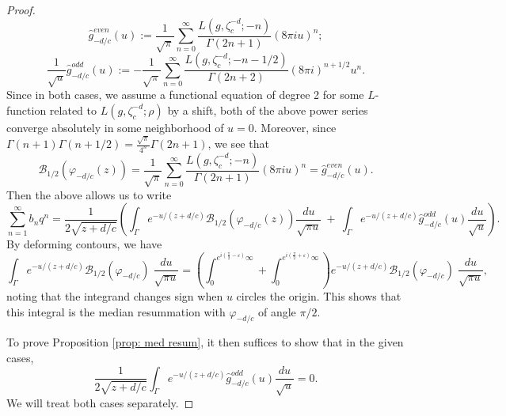 \documentclass[12pt]{amsart}
\theoremstyle{definition}
\theoremstyle{plain}
\numberwithin{equation}{section}
\begin{document}
\begin{proof}
\[
\widehat{g}_{-d/c}^{even}(u) := \frac{1}{\sqrt{\pi }} \sum_{n=0}^\infty \frac{ L(g, \zeta_c^{-d};-n)}{\Gamma(2n+1)}(8\pi iu)^{n};
\]
\[
\frac{1}{\sqrt{u}}\widehat{g}_{-d/c}^{odd}(u) := -\frac{1}{\sqrt{\pi }} \sum_{n=0}^\infty \frac{ L(g, \zeta_c^{-d};-n-1/2)}{\Gamma(2n+2)}(8\pi i)^{n+1/2}u^{n}.
\]
Since in both cases, we assume a functional equation of degree 2 for some $L$-function related to $L(g, \zeta_c^{-d}; \rho)$ by a shift, both of the above power series converge absolutely in some neighborhood of $u=0$. 
Moreover, since $\Gamma(n+1)\Gamma(n+1/2) = \frac{\sqrt{\pi}}{4^n} \Gamma(2n+1)$, we see that 
\[
\mathcal{B}_{1/2}(\varphi_{-d/c}(z)) = \frac{1}{\sqrt{\pi }} \sum_{n=0}^\infty \frac{ L(g, \zeta_c^{-d};-n)}{\Gamma(2n+1)}(8\pi iu)^{n} = \widehat{g}_{-d/c}^{even}(u).
\]
Then the above allows us to write
\begin{equation*}%
\sum_{n = 1}^\infty b_n q^n =  \frac{1}{2\sqrt{z+d/c}} \left( \int_{\Gamma}e^{-u/(z+d/c)} \mathcal{B}_{1/2}(\varphi_{-d/c}(z)) \frac{du}{\sqrt{\pi u}} \ + \ \int_{\Gamma}e^{-u/(z+d/c)}\widehat{g}_{-d/c}^{odd}(u)\frac{du}{\sqrt{u}}\right).
\end{equation*}
By deforming contours, we have
\[
\int_\Gamma e^{-u/(z+d/c)}\mathcal{B}_{1/2}(\varphi_{-d/c})\;\frac{du}{\sqrt{\pi u}} = \left(\int_0^{e^{i(\frac{\pi}{2}-\varepsilon)}\infty}+ \int_0^{e^{i(\frac{\pi}{2}+\varepsilon)}\infty}\right) e^{-u/(z+d/c)}\mathcal{B}_{1/2}(\varphi_{-d/c})\;\frac{du}{\sqrt{\pi u}},
\]	
 noting that the integrand changes sign when $u$ circles the origin. This shows that this integral is the median resummation with $\varphi_{-d/c}$ of angle $\pi/2$. 

To prove Proposition \ref{prop: med resum}, it then suffices to show that in the given cases,
\begin{equation}\label{eqn: 0 integral}
\frac{1}{2\sqrt{z+d/c}}\int_{\Gamma}e^{-u/(z+d/c)}\widehat{g}_{-d/c}^{odd}(u)\frac{du}{\sqrt{u}} = 0.
\end{equation}
We will treat both cases separately. 


\end{proof}
\end{document}

